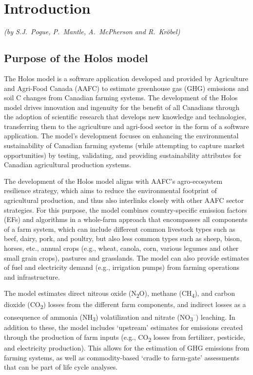\chapter{Introduction}
\label{ch:introduction}

\noindent\textit{(by S.J.\ Pogue, P.\ Mantle, A.\ McPherson and R.\ Kröbel)}

\section{Purpose of the Holos model}
\label{sec:purpose}

The Holos model is a software application developed and provided by Agriculture
and Agri-Food Canada (AAFC) to estimate greenhouse gas (GHG) emissions and soil
C changes from Canadian farming systems. The development of the Holos model
drives innovation and ingenuity for the benefit of all Canadians through the
adoption of scientific research that develops new knowledge and technologies,
transferring them to the agriculture and agri-food sector in the form of a
software application. The model's development focuses on enhancing the
environmental sustainability of Canadian farming systems (while attempting to
capture market opportunities) by testing, validating, and providing
sustainability attributes for Canadian agricultural production systems.

The development of the Holos model aligns with AAFC's agro-ecosystem resilience
strategy, which aims to reduce the environmental footprint of agricultural
production, and thus also interlinks closely with other AAFC sector strategies.
For this purpose, the model combines country-specific emission factors (EFs) and
algorithms in a whole-farm approach that encompasses all components of a farm
system, which can include different common livestock types such as beef, dairy,
pork, and poultry, but also less common types such as sheep, bison, horses,
etc., annual crops (e.g., wheat, canola, corn, various legumes and other small
grain crops), pastures and grasslands. The model can also provide estimates of
fuel and electricity demand (e.g., irrigation pumps) from farming operations
and infrastructure.

The model estimates direct nitrous oxide (N\textsubscript{2}O), methane
(CH\textsubscript{4}), and carbon dioxide (CO\textsubscript{2}) losses from
the different farm components, and indirect losses as a consequence of ammonia
(NH\textsubscript{3}) volatilization and nitrate
(NO\textsubscript{3}\textsuperscript{--}) leaching. In addition to these, the
model includes `upstream' estimates for emissions created through the production
of farm inputs (e.g., CO\textsubscript{2} losses from fertilizer, pesticide,
and electricity production). This allows for the estimation of GHG emissions
from farming systems, as well as commodity-based `cradle to farm-gate'
assessments that can be part of life cycle analyses.

